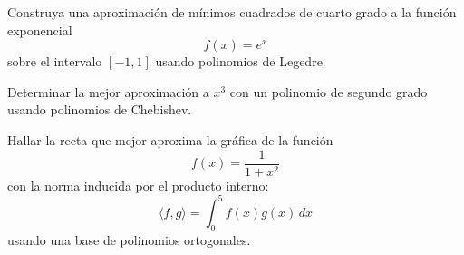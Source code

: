 \documentclass[11pt]{article}
\begin{document}
\begin{question} %
	Construya una aproximación de mínimos cuadrados de cuarto grado a la función exponencial
	\[ f(x) = e^x \]
	sobre el intervalo $[-1, 1]$ usando polinomios de Legedre.
\end{question}

\begin{question} %
	Determinar la mejor aproximación a $x^3$ con un polinomio de segundo grado usando polinomios de Chebishev.
\end{question}


\begin{question} %
	Hallar la recta que mejor aproxima la gráfica de la función
	\[ f(x) = \frac{1}{1 + x^2} \]
	con la norma inducida por el producto interno:
	\[ \langle f, g \rangle = \int_0^5 f(x) g(x) \, dx \]
	usando una base de polinomios ortogonales.
\end{question}
\end{document}
